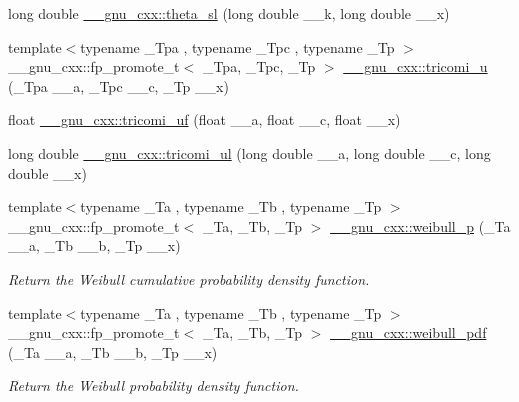 \begin{DoxyCompactItemize}
\item 
long double \hyperlink{group__gnu__math__spec__func_gac574077067a4e7b24a0a9ff2d537d885}{\+\_\+\+\_\+gnu\+\_\+cxx\+::theta\+\_\+sl} (long double \+\_\+\+\_\+k, long double \+\_\+\+\_\+x)
\item 
{\footnotesize template$<$typename \+\_\+\+Tpa , typename \+\_\+\+Tpc , typename \+\_\+\+Tp $>$ }\\\+\_\+\+\_\+gnu\+\_\+cxx\+::fp\+\_\+promote\+\_\+t$<$ \+\_\+\+Tpa, \+\_\+\+Tpc, \+\_\+\+Tp $>$ \hyperlink{group__gnu__math__spec__func_gaf51a13fad85006e4d65c5b117e49f7d8}{\+\_\+\+\_\+gnu\+\_\+cxx\+::tricomi\+\_\+u} (\+\_\+\+Tpa \+\_\+\+\_\+a, \+\_\+\+Tpc \+\_\+\+\_\+c, \+\_\+\+Tp \+\_\+\+\_\+x)
\item 
float \hyperlink{group__gnu__math__spec__func_gab6eb5ec587642bf0952d6c3df1c64904}{\+\_\+\+\_\+gnu\+\_\+cxx\+::tricomi\+\_\+uf} (float \+\_\+\+\_\+a, float \+\_\+\+\_\+c, float \+\_\+\+\_\+x)
\item 
long double \hyperlink{group__gnu__math__spec__func_gac5213af3913aeb8beb7206688889c60c}{\+\_\+\+\_\+gnu\+\_\+cxx\+::tricomi\+\_\+ul} (long double \+\_\+\+\_\+a, long double \+\_\+\+\_\+c, long double \+\_\+\+\_\+x)
\item 
{\footnotesize template$<$typename \+\_\+\+Ta , typename \+\_\+\+Tb , typename \+\_\+\+Tp $>$ }\\\+\_\+\+\_\+gnu\+\_\+cxx\+::fp\+\_\+promote\+\_\+t$<$ \+\_\+\+Ta, \+\_\+\+Tb, \+\_\+\+Tp $>$ \hyperlink{group__gnu__math__spec__func_ga9afb3065fea6ef3a91126d67f726f7af}{\+\_\+\+\_\+gnu\+\_\+cxx\+::weibull\+\_\+p} (\+\_\+\+Ta \+\_\+\+\_\+a, \+\_\+\+Tb \+\_\+\+\_\+b, \+\_\+\+Tp \+\_\+\+\_\+x)
\begin{DoxyCompactList}\small\item\em Return the Weibull cumulative probability density function. \end{DoxyCompactList}\item 
{\footnotesize template$<$typename \+\_\+\+Ta , typename \+\_\+\+Tb , typename \+\_\+\+Tp $>$ }\\\+\_\+\+\_\+gnu\+\_\+cxx\+::fp\+\_\+promote\+\_\+t$<$ \+\_\+\+Ta, \+\_\+\+Tb, \+\_\+\+Tp $>$ \hyperlink{group__gnu__math__spec__func_gacfbb6ca9df8e0aa092ff4406baff597c}{\+\_\+\+\_\+gnu\+\_\+cxx\+::weibull\+\_\+pdf} (\+\_\+\+Ta \+\_\+\+\_\+a, \+\_\+\+Tb \+\_\+\+\_\+b, \+\_\+\+Tp \+\_\+\+\_\+x)
\begin{DoxyCompactList}\small\item\em Return the Weibull probability density function. \end{DoxyCompactList}\item 

\end{DoxyCompactItemize}
